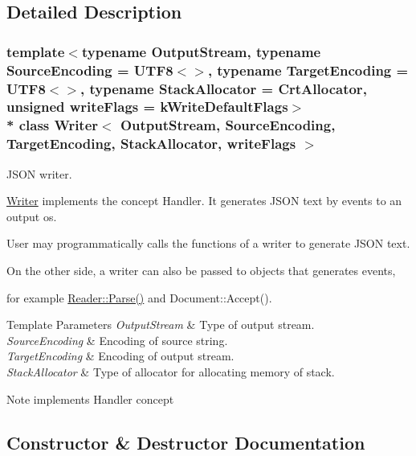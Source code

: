 \subsection{Detailed Description}
\subsubsection*{template$<$typename Output\+Stream, typename Source\+Encoding = U\+T\+F8$<$$>$, typename Target\+Encoding = U\+T\+F8$<$$>$, typename Stack\+Allocator = Crt\+Allocator, unsigned write\+Flags = k\+Write\+Default\+Flags$>$\\*
class Writer$<$ Output\+Stream, Source\+Encoding, Target\+Encoding, Stack\+Allocator, write\+Flags $>$}

J\+S\+ON writer. 

\hyperlink{class_writer}{Writer} implements the concept Handler. It generates J\+S\+ON text by events to an output os.

User may programmatically calls the functions of a writer to generate J\+S\+ON text.

On the other side, a writer can also be passed to objects that generates events,

for example \hyperlink{class_generic_reader_a0c450620d14ff1824e58bb7bd9b42099}{Reader\+::\+Parse()} and Document\+::\+Accept().


\begin{DoxyTemplParams}{Template Parameters}
{\em Output\+Stream} & Type of output stream. \\
\hline
{\em Source\+Encoding} & Encoding of source string. \\
\hline
{\em Target\+Encoding} & Encoding of output stream. \\
\hline
{\em Stack\+Allocator} & Type of allocator for allocating memory of stack. \\
\hline
\end{DoxyTemplParams}
\begin{DoxyNote}{Note}
implements Handler concept 
\end{DoxyNote}


\subsection{Constructor \& Destructor Documentation}

